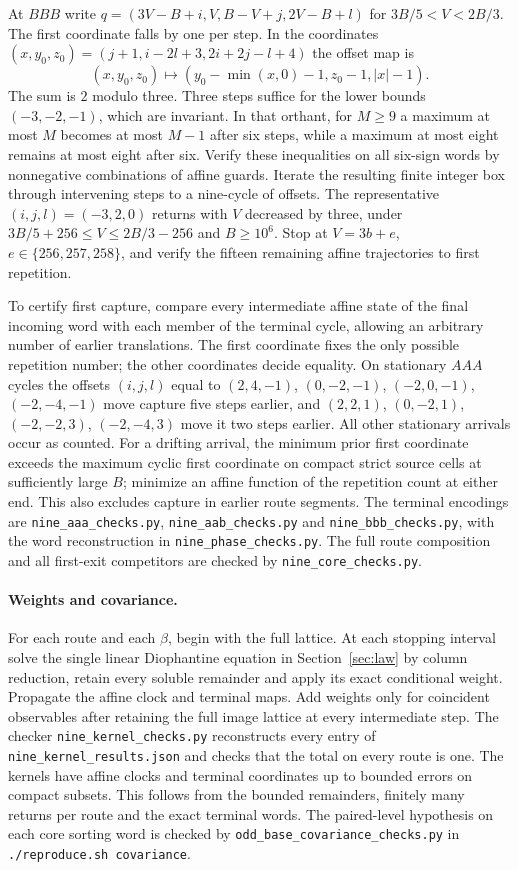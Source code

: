 \documentclass[11pt,reqno]{amsart}
\newcommand{\runcheck}[1]{\texttt{./reproduce.sh\ #1}}
\newcommand{\file}[1]{\nolinkurl{#1}}
\begin{document}
At $BBB$ write
$q=(3V-B+i,V,B-V+j,2V-B+l)$ for $3B/5<V<2B/3$.
The first coordinate falls by one per step. In the coordinates
$(x,y_0,z_0)=(j+1,i-2l+3,2i+2j-l+4)$ the offset map is
\[
 (x,y_0,z_0)\longmapsto(y_0-\min(x,0)-1,z_0-1,|x|-1).
\]
The sum is $2$ modulo three. Three steps suffice for the lower bounds
$(-3,-2,-1)$, which are invariant. In that orthant, for $M\ge9$ a
maximum at most $M$ becomes at most $M-1$ after six steps, while a
maximum at most eight remains at most eight after six. Verify these
inequalities on all six-sign words by nonnegative combinations of affine
guards. Iterate the resulting finite integer box through intervening
steps to a nine-cycle of offsets. The representative
$(i,j,l)=(-3,2,0)$ returns with $V$ decreased by three, under
$3B/5+256\le V\le2B/3-256$ and $B\ge10^6$. Stop at
$V=3b+e$, $e\in\{256,257,258\}$, and verify the fifteen remaining
affine trajectories to first repetition.

To certify first capture, compare every intermediate affine state of
the final incoming word with each member of the terminal cycle, allowing
an arbitrary number of earlier translations. The first coordinate fixes
the only possible repetition number; the other coordinates decide equality.
On stationary $AAA$ cycles the offsets $(i,j,l)$ equal to
$(2,4,-1)$, $(0,-2,-1)$, $(-2,0,-1)$, $(-2,-4,-1)$ move capture five steps
earlier, and $(2,2,1)$, $(0,-2,1)$, $(-2,-2,3)$, $(-2,-4,3)$ move it two
steps earlier. All other stationary arrivals occur as counted. For a
drifting arrival, the minimum prior first coordinate exceeds the maximum
cyclic first coordinate on compact strict source cells at sufficiently
large $B$; minimize an affine function of the repetition count at either
end. This also excludes capture in earlier route segments. The terminal
encodings are \file{nine_aaa_checks.py}, \file{nine_aab_checks.py} and
\file{nine_bbb_checks.py}, with the word reconstruction in
\file{nine_phase_checks.py}. The full route composition and all first-exit
competitors are checked by \file{nine_core_checks.py}.

\paragraph{Weights and covariance.}
For each route and each $\beta$, begin with the full lattice.
At each stopping interval solve the single linear Diophantine equation
in Section~\ref{sec:law} by column reduction, retain every soluble
remainder and apply its exact conditional weight. Propagate the affine
clock and terminal maps. Add weights only for coincident observables
after retaining the full image lattice at every intermediate step.
The checker \file{nine_kernel_checks.py} reconstructs every entry of
\file{nine_kernel_results.json} and checks that the total on every
route is one. The kernels have affine clocks and terminal coordinates up
to bounded errors on compact subsets. This follows from the bounded
remainders, finitely many returns per route and the exact terminal words.
The paired-level hypothesis on each core sorting word is checked by
\file{odd_base_covariance_checks.py} in \runcheck{covariance}.
\end{document}
